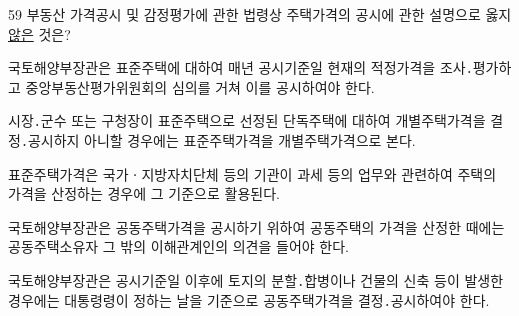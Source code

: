 \begin{question}{59}
부동산 가격공시 및 감정평가에 관한 법령상 주택가격의 공시에 관한 설명으로 옳지 \uline{않은} 것은?
\begin{choices}
  \item 국토해양부장관은 표준주택에 대하여 매년 공시기준일 현재의 적정가격을 조사․평가하고 중앙부동산평가위원회의 심의를 거쳐 이를 공시하여야 한다.
  \item 시장․군수 또는 구청장이 표준주택으로 선정된 단독주택에 대하여 개별주택가격을 결정․공시하지 아니할 경우에는 표준주택가격을 개별주택가격으로 본다.
  \item 표준주택가격은 국가ㆍ지방자치단체 등의 기관이 과세 등의 업무와 관련하여 주택의 가격을 산정하는 경우에 그 기준으로 활용된다.
  \item 국토해양부장관은 공동주택가격을 공시하기 위하여 공동주택의 가격을 산정한 때에는 공동주택소유자 그 밖의 이해관계인의 의견을 들어야 한다.
  \item 국토해양부장관은 공시기준일 이후에 토지의 분할․합병이나 건물의 신축 등이 발생한 경우에는 대통령령이 정하는 날을 기준으로 공동주택가격을 결정․공시하여야 한다.
\end{choices}
\end{question}
